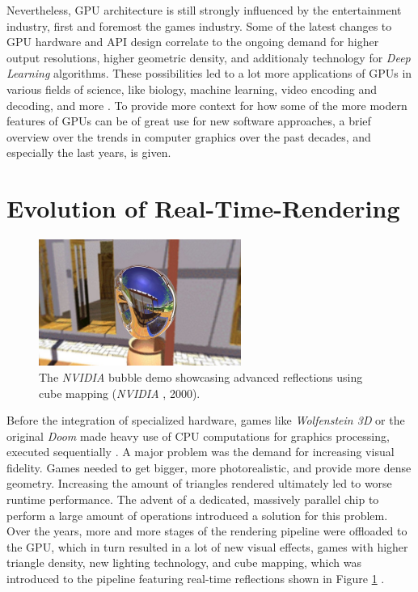 \noindent
Nevertheless, \ac{GPU} architecture is still strongly influenced by the entertainment 
industry, first and foremost the games industry. Some of the latest changes to \ac{GPU} 
hardware and \ac{API} design correlate to the ongoing demand for higher output resolutions, 
higher geometric density, and additionaly technology for \emph{Deep Learning} algorithms. 
These possibilities led to a lot more applications of \ac{GPU}s in various fields of science, 
like biology, machine learning, video encoding and decoding, and more \cite{Battaglia2024}.
To provide more context for how some of the more modern features of \ac{GPU}s can be of great 
use for new software approaches, a brief overview over the trends in computer graphics over 
the past decades, and especially the last years, is given.


\section{Evolution of Real-Time-Rendering} \label{sec-evolution-of-real-time-rendering}

\begin{figure}[h]
    \centering
    \includegraphics[width=250px]{images/graphics/bubble-reflection-effects-demo.jpg}
    \caption{The \emph{NVIDIA} bubble demo showcasing advanced reflections using cube mapping (\emph{NVIDIA} \cite{NVIDIABubble}, 2000).}
    \label{fig:bubble-reflection-demo}
\end{figure}

\noindent
Before the integration of specialized hardware, games like \emph{Wolfenstein 3D} or the 
original \emph{Doom} made heavy use of \ac{CPU} computations for graphics processing, 
executed sequentially \cite{NVIDIA1999}. A major problem was the demand for increasing 
visual fidelity. Games needed to get bigger, more photorealistic, and provide more dense 
geometry. Increasing the amount of triangles rendered ultimately led to worse runtime 
performance. The advent of a dedicated, massively parallel chip to perform a large amount of 
operations introduced a solution for this problem. Over the years, more and more stages of the 
rendering pipeline were offloaded to the \ac{GPU}, which in turn resulted in a lot of new visual 
effects, games with higher triangle density, new lighting technology, and cube mapping, which 
was introduced to the pipeline featuring real-time reflections shown in  Figure 
\ref{fig:bubble-reflection-demo} \cite{Battaglia2024}.


